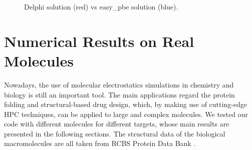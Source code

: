 \documentclass[11pt,a4paper]{article}
\begin{document}
\begin{figure}[H]
    \centering
    \quad
    \caption[]{Delphi solution (red) vs easy\_pbe solution (blue).}
    \label{fig:test3_del}
\end{figure}

\section{Numerical Results on Real Molecules}
\label{sec:num_res}
Nowadays, the use of molecular electrostatics simulations in chemistry and biology is still an important tool. The main applications regard the protein folding and structural-based drug design, which, by making use of cutting-edge HPC techniques, can be applied to large and complex molecules. 
We tested our code with different molecules for different targets, whose main results are presented in the following sections. The structural data of the biological macromolecules are all taken from RCBS Protein Data Bank \cite{RCBS}.
\end{document}
